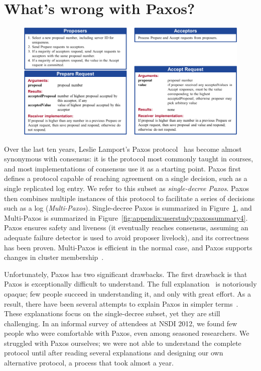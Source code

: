 \section{What's wrong with Paxos?}
\label{motivation:paxos}

\begin{figure}
\centering
\includegraphics[scale=0.95]{motivation/paxossummary}
\label{fig:motivation:paxos:basic}
\end{figure}


Over the last ten years, Leslie Lamport's Paxos protocol~\cite{Lamport:1998}
has become almost synonymous with consensus: it is the protocol
most commonly taught in courses, and most implementations of consensus
use it as a starting point. Paxos first defines a protocol capable
of reaching agreement on a single decision, such as a single replicated
log entry.  We refer to this subset as \emph{single-decree Paxos}.
Paxos then combines multiple instances of this protocol to facilitate
a series of decisions such as a log (\emph{Multi-Paxos}).
Single-decree Paxos is summarized in
Figure~\ref{fig:motivation:paxos:basic}, and Multi-Paxos is summarized
in Figure~\ref{fig:appendix:userstudy:paxossummary4}.
Paxos ensures safety and liveness (it eventually reaches consensus,
assuming an adequate failure detector
is used to avoid proposer livelock), and its correctness has been proven.
Multi-Paxos is efficient in the normal case, and Paxos supports changes
in cluster membership~\cite{Lorch:2006}.

Unfortunately, Paxos has two significant drawbacks.  The first drawback is
that Paxos is exceptionally difficult to understand. The full
explanation~\cite{Lamport:1998} is notoriously opaque; few
people succeed in understanding it, and only with great effort.
As a result, there have been several attempts to explain Paxos
in simpler terms~\cite{Lamport:2001, Lampson:1996, Lampson:2001}.
These explanations focus on the single-decree subset,
yet they are still challenging.
In an informal survey of attendees at NSDI 2012, we found few people who
were comfortable with Paxos, even among seasoned researchers.
We struggled with Paxos ourselves; we were not able to understand
the complete protocol
until after reading several explanations
and designing our own alternative protocol, a process that took
almost a year.

